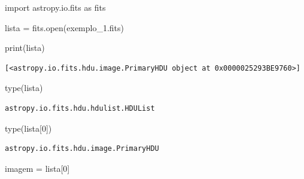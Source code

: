 \documentclass[
  letterpaper,
  DIV=11,
  numbers=noendperiod]{scrreprt}
\newenvironment{Shaded}{\begin{snugshade}}{\end{snugshade}}
\newcommand{\BuiltInTok}[1]{\textcolor[rgb]{0.00,0.23,0.31}{#1}}
\newcommand{\DecValTok}[1]{\textcolor[rgb]{0.68,0.00,0.00}{#1}}
\newcommand{\ImportTok}[1]{\textcolor[rgb]{0.00,0.46,0.62}{#1}}
\newcommand{\NormalTok}[1]{\textcolor[rgb]{0.00,0.23,0.31}{#1}}
\newcommand{\OperatorTok}[1]{\textcolor[rgb]{0.37,0.37,0.37}{#1}}
\newcommand{\StringTok}[1]{\textcolor[rgb]{0.13,0.47,0.30}{#1}}
\begin{document}
\begin{Shaded}
\begin{Highlighting}[]
\ImportTok{import}\NormalTok{ astropy.io.fits }\ImportTok{as}\NormalTok{ fits}
\end{Highlighting}
\end{Shaded}

\begin{Shaded}
\begin{Highlighting}[]
\NormalTok{lista }\OperatorTok{=}\NormalTok{ fits.}\BuiltInTok{open}\NormalTok{(}\StringTok{\textquotesingle{}exemplo\_1.fits\textquotesingle{}}\NormalTok{)}
\end{Highlighting}
\end{Shaded}

\begin{Shaded}
\begin{Highlighting}[]
\BuiltInTok{print}\NormalTok{(lista)}
\end{Highlighting}
\end{Shaded}

\begin{verbatim}
[<astropy.io.fits.hdu.image.PrimaryHDU object at 0x0000025293BE9760>]
\end{verbatim}

\begin{Shaded}
\begin{Highlighting}[]
\BuiltInTok{type}\NormalTok{(lista)}
\end{Highlighting}
\end{Shaded}

\begin{verbatim}
astropy.io.fits.hdu.hdulist.HDUList
\end{verbatim}

\begin{Shaded}
\begin{Highlighting}[]
\BuiltInTok{type}\NormalTok{(lista[}\DecValTok{0}\NormalTok{])}
\end{Highlighting}
\end{Shaded}

\begin{verbatim}
astropy.io.fits.hdu.image.PrimaryHDU
\end{verbatim}

\begin{Shaded}
\begin{Highlighting}[]
\NormalTok{imagem }\OperatorTok{=}\NormalTok{ lista[}\DecValTok{0}\NormalTok{]}
\end{Highlighting}
\end{Shaded}
\end{document}

